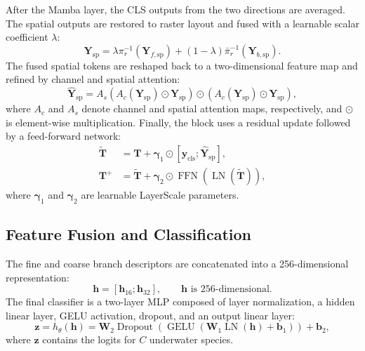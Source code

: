 After the Mamba layer, the CLS outputs from the two directions are averaged. The spatial outputs are restored to raster layout and fused with a learnable scalar coefficient $\lambda$:
\begin{equation}
  \mathbf{Y}_{\mathrm{sp}}
  =
  \lambda \pi_r^{-1}(\mathbf{Y}_{f,\mathrm{sp}})
  +
  (1-\lambda)\bar{\pi}_r^{-1}(\mathbf{Y}_{b,\mathrm{sp}}).
  \label{eq:direction-fusion}
\end{equation}
The fused spatial tokens are reshaped back to a two-dimensional feature map and refined by channel and spatial attention:
\begin{equation}
  \widehat{\mathbf{Y}}_{\mathrm{sp}}
  =
  A_s(A_c(\mathbf{Y}_{\mathrm{sp}})\odot \mathbf{Y}_{\mathrm{sp}})
  \odot
  (A_c(\mathbf{Y}_{\mathrm{sp}})\odot \mathbf{Y}_{\mathrm{sp}}),
  \label{eq:attention}
\end{equation}
where $A_c$ and $A_s$ denote channel and spatial attention maps, respectively, and $\odot$ is element-wise multiplication. Finally, the block uses a residual update followed by a feed-forward network:
\begin{align}
  \widetilde{\mathbf{T}}
  &=
  \mathbf{T}
  +
  \boldsymbol{\gamma}_{1}\odot
  [\mathbf{y}_{\mathrm{cls}};\widehat{\mathbf{Y}}_{\mathrm{sp}}],
  \nonumber \\
  \mathbf{T}^{+}
  &=
  \widetilde{\mathbf{T}}
  +
  \boldsymbol{\gamma}_{2}\odot
  \operatorname{FFN}(\operatorname{LN}(\widetilde{\mathbf{T}})),
  \label{eq:block-update}
\end{align}
where $\boldsymbol{\gamma}_{1}$ and $\boldsymbol{\gamma}_{2}$ are learnable LayerScale parameters.

\subsection{Feature Fusion and Classification}

The fine and coarse branch descriptors are concatenated into a 256-dimensional representation:
\begin{equation}
  \mathbf{h}
  =
  [\mathbf{h}_{16};\mathbf{h}_{32}],
  \qquad
  \mathbf{h} \text{ is 256-dimensional}.
  \label{eq:feature-fusion}
\end{equation}
The final classifier is a two-layer MLP composed of layer normalization, a hidden linear layer, GELU activation, dropout, and an output linear layer:
\begin{equation}
  \mathbf{z}
  =
  h_{\theta}(\mathbf{h})
  =
  \mathbf{W}_{2}
  \operatorname{Dropout}
  \left(
    \operatorname{GELU}
    \left(
      \mathbf{W}_{1}\operatorname{LN}(\mathbf{h}) + \mathbf{b}_{1}
    \right)
  \right)
  +
  \mathbf{b}_{2},
  \label{eq:classifier}
\end{equation}
where $\mathbf{z}$ contains the logits for $C$ underwater species.

